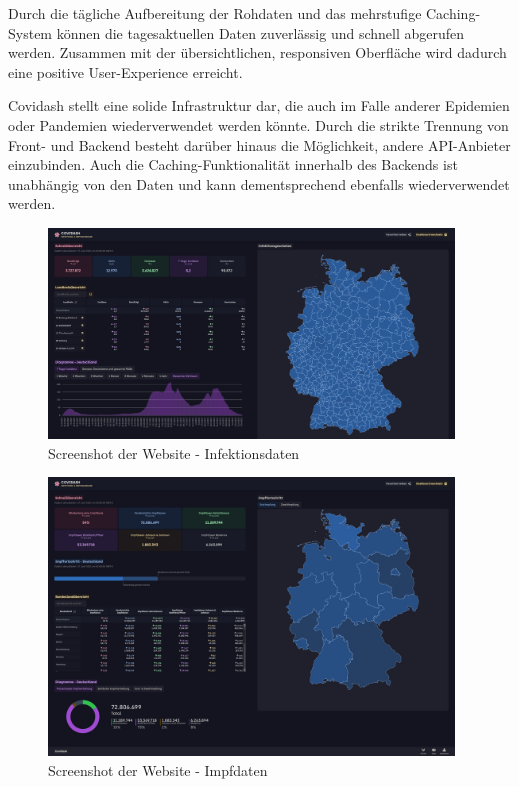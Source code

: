 \documentclass[conference]{IEEEtran}
\begin{document}
Durch die tägliche Aufbereitung der Rohdaten und das mehrstufige Caching-System können die tagesaktuellen Daten zuverlässig und schnell abgerufen werden. Zusammen mit der übersichtlichen, responsiven Oberfläche wird dadurch eine positive User-Experience erreicht.

Covidash stellt eine solide Infrastruktur dar, die auch im Falle anderer Epidemien oder Pandemien wiederverwendet werden könnte. Durch die strikte Trennung von Front- und Backend besteht darüber hinaus die Möglichkeit, andere API-Anbieter einzubinden. Auch die Caching-Funktionalität innerhalb des Backends ist unabhängig von den Daten und kann dementsprechend ebenfalls wiederverwendet werden.





\begin{figure}[ht!]%
    \centering%
    \includegraphics[width=0.96\textwidth]{img/screenshot_infections.jpg}%
    \caption{Screenshot der Website - Infektionsdaten}%
    \label{abb:screen_infections}%
\end{figure}

\begin{figure}[ht!]%
    \centering%
    \includegraphics[width=0.96\textwidth]{img/screenshot_vaccines.jpg}%
    \caption{Screenshot der Website - Impfdaten}%
    \label{abb:screen_vaccines}%
\end{figure}
\end{document}
